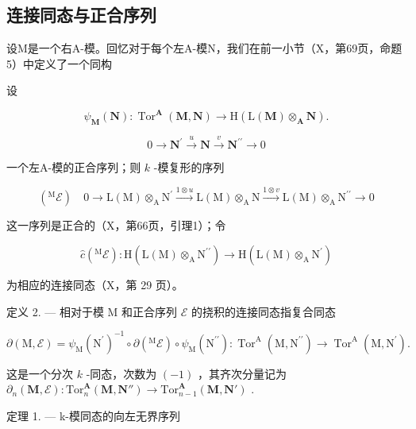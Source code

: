 \subsection{连接同态与正合序列}

设M是一个右A-模。回忆对于每个左A-模N，我们在前一小节（X，第69页，命题5）中定义了一个同构

设

\[
\psi_ {\mathbf {M}} (\mathbf {N}): \operatorname{Tor} ^ {\mathbf {A}} (\mathbf {M}, \mathbf {N}) \rightarrow \mathrm{H} (\mathrm{L} (\mathbf {M}) \otimes_ {\mathbf {A}} \mathbf {N}).\tag{ε}
\]

\[
0 \rightarrow \mathbf {N} ^ {\prime} \xrightarrow {u} \mathbf {N} \xrightarrow {v} \mathbf {N} ^ {\prime \prime} \rightarrow 0
\]

一个左A-模的正合序列；则 \(k\) -模复形的序列

\[
\left(^ {\mathrm{M}} \mathcal {E}\right) \quad 0 \longrightarrow \mathrm{L} (\mathrm{M}) \otimes_ {\mathrm{A}} \mathrm{N} ^ {\prime} \xrightarrow {1 \otimes u} \mathrm{L} (\mathrm{M}) \otimes_ {\mathrm{A}} \mathrm{N} \xrightarrow {1 \otimes v} \mathrm{L} (\mathrm{M}) \otimes_ {\mathrm{A}} \mathrm{N} ^ {\prime \prime} \longrightarrow 0
\]

这一序列是正合的（X，第66页，引理1）；令

\[
\hat {c} \left(^ {\mathrm{M}} \mathcal {E}\right): \mathrm{H} (\mathrm{L} (\mathrm{M}) \otimes_ {\mathrm{A}} \mathrm{N} ^ {\prime \prime}) \rightarrow \mathrm{H} (\mathrm{L} (\mathrm{M}) \otimes_ {\mathrm{A}} \mathrm{N} ^ {\prime})
\]

为相应的连接同态（X，第 29 页）。

定义 2. --- 相对于模 M 和正合序列 \(\mathcal{E}\) 的挠积的连接同态指复合同态

\[
\partial (\mathrm{M}, \mathcal {E}) = \psi_ {\mathrm{M}} \left(\mathrm{N} ^ {\prime}\right) ^ {- 1} \circ \partial \left(^ {\mathrm{M}} \mathcal {E}\right) \circ \psi_ {\mathrm{M}} \left(\mathrm{N} ^ {\prime \prime}\right): \operatorname{Tor} ^ {\mathrm{A}} \left(\mathrm{M}, \mathrm{N} ^ {\prime \prime}\right)\rightarrow \operatorname{Tor} ^ {\mathrm{A}} \left(\mathrm{M}, \mathrm{N} ^ {\prime}\right).
\]

这是一个分次 \(k\) -同态，次数为 \((-1)\) ，其齐次分量记为 \(\partial_n(\mathbf{M}, \mathcal{E}) : \mathrm{Tor}_n^{\mathbf{A}}(\mathbf{M}, \mathbf{N}'') \to \mathrm{Tor}_{n-1}^{\mathbf{A}}(\mathbf{M}, \mathbf{N}')\) .

定理 1. --- k-模同态的向左无界序列

